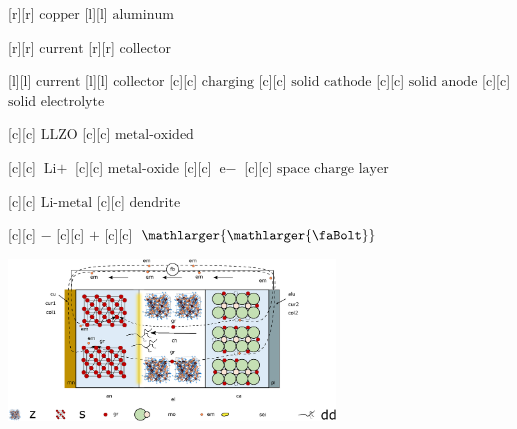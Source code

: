 \begin{Figure}[h]
    \centering
    \footnotesize

    [r][r] {$\text{copper}$}
    [l][l] {$\text{aluminum}$}
		
		 {$\text{current}$}
		 {$\text{collector}$}
		
		 {$\text{current}$}
		 {$\text{collector}$}
    [c][c] {$\text{charging}$}
		 {$\text{solid cathode}$}
		 {$\text{solid anode}$}
		 {$\text{solid electrolyte}$}
		
		
		 {$\text{LLZO}$}
		 {$\text{metal-oxided}$}
		
		 {$\text{Li}+$}
		 {$\text{metal-oxide}$}
    [c][c] {$\text{e}-$}
		 {$\text{space charge layer}$}
		
		 {$\text{Li-metal}$}
		 {$\text{dendrite}$}
    
		 {$-$}
		 {$+$}
		 {$\mathlarger{\mathlarger{\text{\faBolt}}}$}
		
    \includegraphics[width=0.65\textwidth]{transport.eps}
		
\end{Figure}


